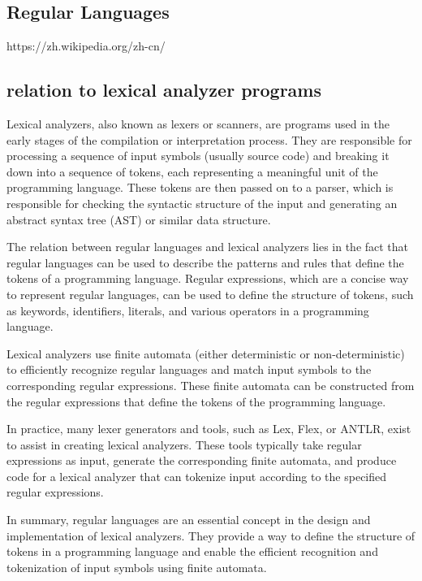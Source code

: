 \documentclass{article}
\begin{document}
\subsection{Regular Languages}

https://zh.wikipedia.org/zh-cn/%


\subsection{relation to lexical analyzer programs}

Lexical analyzers, also known as lexers or scanners, are programs used in the early stages of the compilation or interpretation process. They are responsible for processing a sequence of input symbols (usually source code) and breaking it down into a sequence of tokens, each representing a meaningful unit of the programming language. These tokens are then passed on to a parser, which is responsible for checking the syntactic structure of the input and generating an abstract syntax tree (AST) or similar data structure.

The relation between regular languages and lexical analyzers lies in the fact that regular languages can be used to describe the patterns and rules that define the tokens of a programming language. Regular expressions, which are a concise way to represent regular languages, can be used to define the structure of tokens, such as keywords, identifiers, literals, and various operators in a programming language.

Lexical analyzers use finite automata (either deterministic or non-deterministic) to efficiently recognize regular languages and match input symbols to the corresponding regular expressions. These finite automata can be constructed from the regular expressions that define the tokens of the programming language.

In practice, many lexer generators and tools, such as Lex, Flex, or ANTLR, exist to assist in creating lexical analyzers. These tools typically take regular expressions as input, generate the corresponding finite automata, and produce code for a lexical analyzer that can tokenize input according to the specified regular expressions.

In summary, regular languages are an essential concept in the design and implementation of lexical analyzers. They provide a way to define the structure of tokens in a programming language and enable the efficient recognition and tokenization of input symbols using finite automata.
\end{document}
